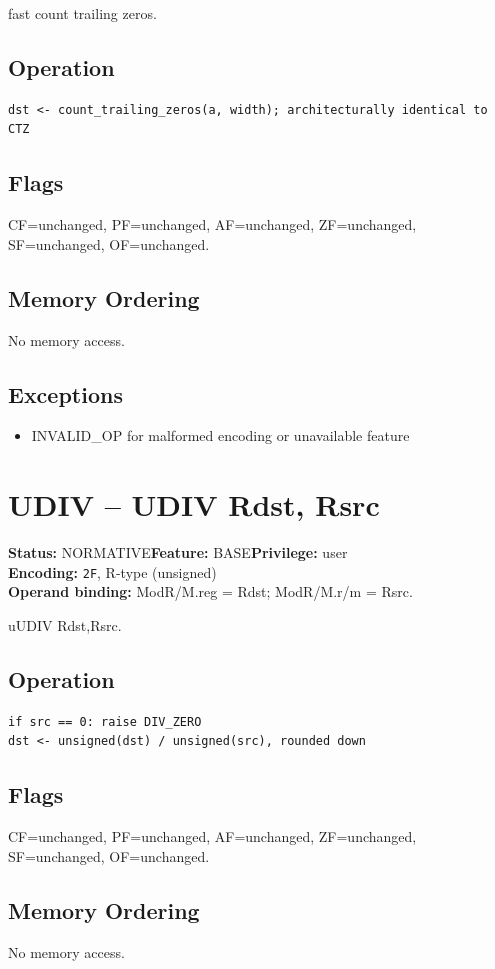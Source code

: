 \documentclass[10pt]{article}
\begin{document}
fast count trailing zeros.

\subsection*{Operation}
\begin{lstlisting}
dst <- count_trailing_zeros(a, width); architecturally identical to CTZ
\end{lstlisting}
\subsection*{Flags}
CF=unchanged, PF=unchanged, AF=unchanged, ZF=unchanged, SF=unchanged, OF=unchanged.
\subsection*{Memory Ordering}
No memory access.
\subsection*{Exceptions}
\begin{itemize}
\item INVALID\_OP for malformed encoding or unavailable feature
\end{itemize}
\clearpage

\section{UDIV -- UDIV Rdst, Rsrc}
\textbf{Status:} NORMATIVE\quad \textbf{Feature:} BASE\quad \textbf{Privilege:} user\\
\textbf{Encoding:} \texttt{2F}, R-type (unsigned)\\
\textbf{Operand binding:} ModR/M.reg = Rdst; ModR/M.r/m = Rsrc.

uUDIV Rdst,Rsrc.

\subsection*{Operation}
\begin{lstlisting}
if src == 0: raise DIV_ZERO
dst <- unsigned(dst) / unsigned(src), rounded down
\end{lstlisting}
\subsection*{Flags}
CF=unchanged, PF=unchanged, AF=unchanged, ZF=unchanged, SF=unchanged, OF=unchanged.
\subsection*{Memory Ordering}
No memory access.
\end{document}
